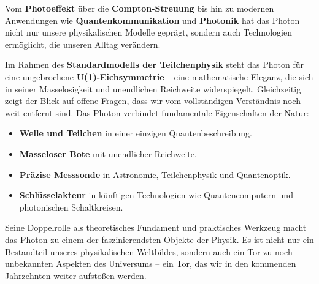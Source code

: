 Vom \textbf{Photoeffekt} über die \textbf{Compton-Streuung} bis hin zu modernen Anwendungen wie \textbf{Quantenkommunikation} und \textbf{Photonik} hat das Photon nicht nur unsere physikalischen Modelle geprägt, sondern auch Technologien ermöglicht, die unseren Alltag verändern.

Im Rahmen des \textbf{Standardmodells der Teilchenphysik} steht das Photon für eine ungebrochene \textbf{U(1)-Eichsymmetrie} – eine mathematische Eleganz, die sich in seiner Masselosigkeit und unendlichen Reichweite widerspiegelt.  
Gleichzeitig zeigt der Blick auf offene Fragen, dass wir vom vollständigen Verständnis noch weit entfernt sind.
\newpage
\noindent
Das Photon verbindet fundamentale Eigenschaften der Natur:
\begin{itemize}
	\item \textbf{Welle und Teilchen} in einer einzigen Quantenbeschreibung.
	\item \textbf{Masseloser Bote} mit unendlicher Reichweite.
	\item \textbf{Präzise Messsonde} in Astronomie, Teilchenphysik und Quantenoptik.
	\item \textbf{Schlüsselakteur} in künftigen Technologien wie Quantencomputern und photonischen Schaltkreisen.
\end{itemize}

Seine Doppelrolle als theoretisches Fundament und praktisches Werkzeug macht das Photon zu einem der faszinierendsten Objekte der Physik.  
Es ist nicht nur ein Bestandteil unseres physikalischen Weltbildes, sondern auch ein Tor zu noch unbekannten Aspekten des Universums – ein Tor, das wir in den kommenden Jahrzehnten weiter aufstoßen werden.



